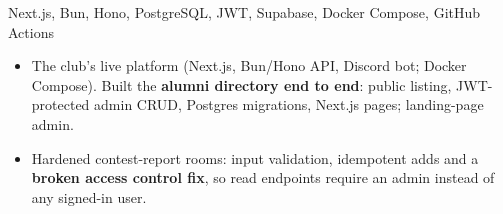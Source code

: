 {}
{Next.js, Bun, Hono, PostgreSQL, JWT, Supabase, Docker Compose, GitHub Actions}
{\begin{itemize}
  \item The club's live platform (Next.js, Bun/Hono API, Discord bot; Docker Compose). Built the \textbf{alumni directory end to end}: public listing, JWT-protected admin CRUD, Postgres migrations, Next.js pages; landing-page admin.
  \item Hardened contest-report rooms: input validation, idempotent adds and a \textbf{broken access control fix}, so read endpoints require an admin instead of any signed-in user.
\end{itemize}}
